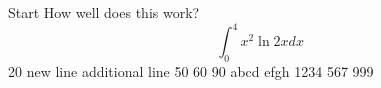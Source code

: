 \documentclass{article}
\begin{document}
Start
How well does this work?
$$\int_0^4 x^2 \ln{2x}dx$$
20
new line
additional line
50
60
90
abcd
efgh
1234
567
999
\end{document}

